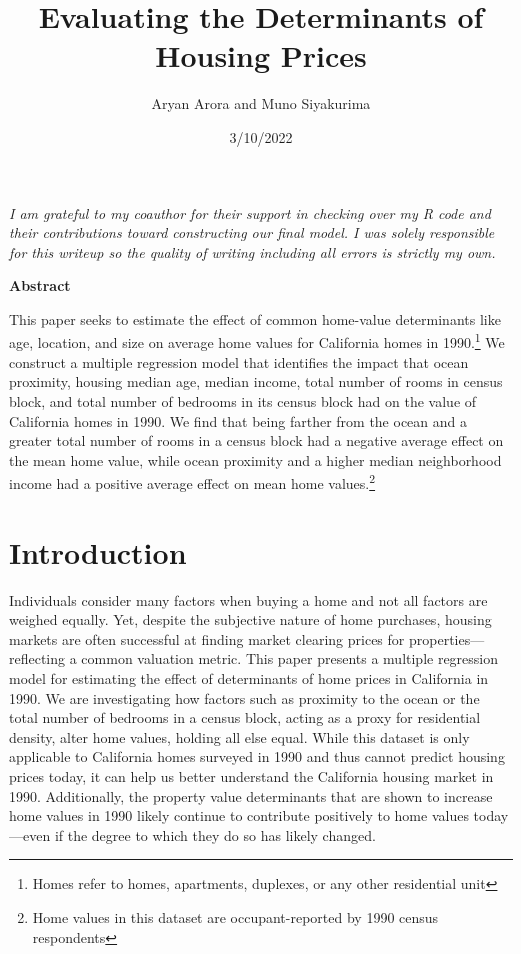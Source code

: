 \documentclass{article}
\begin{document}
\title{Evaluating the Determinants of Housing Prices}
\author{Aryan Arora and Muno Siyakurima}
\date{3/10/2022}

\maketitle

\noindent \emph{I am grateful to my coauthor for their support in checking over my R code and their contributions toward constructing our final model. I was solely responsible for this writeup so the quality of writing including all errors is strictly my own.}

\begin{center}
    \textbf{Abstract}
\end{center}

\noindent This paper seeks to estimate the effect of common home-value determinants like age, location, and size on average home values for California homes in 1990.\footnote{Homes refer to homes, apartments, duplexes, or any other residential unit} We construct a multiple regression model that identifies the impact that ocean proximity, housing median age, median income, total number of rooms in census block, and total number of bedrooms in its census block had on the value of California homes in 1990. We find that being farther from the ocean and a greater total number of rooms in a census block had a negative average effect on the mean home value, while ocean proximity and a higher median neighborhood income had a positive average effect on mean home values.\footnote{Home values in this dataset are occupant-reported by 1990 census respondents}

\section*{Introduction}

Individuals consider many factors when buying a home and not all factors are weighed equally. Yet, despite the subjective nature of home purchases, housing markets are often successful at finding market clearing prices for properties—reflecting a common valuation metric. This paper presents a multiple regression model for estimating the effect of determinants of home prices in California in 1990. We are investigating how factors such as proximity to the ocean or the total number of bedrooms in a census block, acting as a proxy for residential density, alter home values, holding all else equal. While this dataset is only applicable to California homes surveyed in 1990 and thus cannot predict housing prices today, it can help us better understand the California housing market in 1990. Additionally, the property value determinants that are shown to increase home values in 1990 likely continue to contribute positively to home values today—even if the degree to which they do so has likely changed. 
\end{document}
